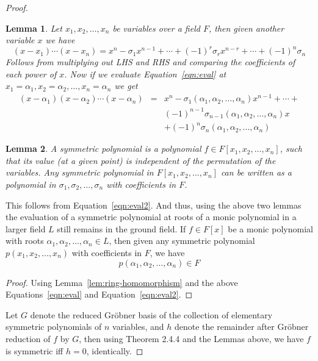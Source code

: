 \documentclass{article}[12pt]
\newtheorem{lem}{Lemma}
\begin{document}
\begin{proof}
\begin{lem}
Let $x_1,x_2,\ldots,x_n$ be variables over a field
$F$, then given another variable $x$ we have
\begin{equation}
(x-x_1)\cdots(x-x_n) = x^n -\sigma_1x^{n-1}+\cdots+(-1)^r\sigma_r x^{n-r}
+\cdots+(-1)^n\sigma_n \label{eqn:eval}
\end{equation}
Follows from multiplying out LHS and RHS and comparing the coefficients of each
power of $x$.
Now if we evaluate Equation~\ref{eqn:eval} at 
$x_1=\alpha_1,x_2=\alpha_2,\ldots,x_n=\alpha_n$ we get
\begin{eqnarray}
(x-\alpha_1)(x-\alpha_2)\cdots(x-\alpha_n) & = & x^n -\sigma_1(\alpha_1,\alpha_2,\ldots,\alpha_n)x^{n-1} +\cdots+ \nonumber \\
 & & (-1)^{n-1}\sigma_{n-1}(\alpha_1,\alpha_2,\ldots,\alpha_n)x \nonumber \\
 & & + (-1)^n\sigma_n(\alpha_1,\alpha_2,\ldots,\alpha_n) \label{eqn:eval2}
\end{eqnarray}
\end{lem}

\begin{lem}
A symmetric polynomial is a polynomial $f\in F[x_1,x_2,\ldots,x_n]$, such that
its value (at a given point) is independent of the permutation of the variables.
Any symmetric polynomial in $F[x_1,x_2,\ldots,x_n]$ can be written as 
a polynomial in $\sigma_1,\sigma_2,\ldots,\sigma_n$ with coefficients in $F$.
\end{lem}
This follows from Equation~\ref{eqn:eval2}. And thus, using the
above two lemmas the evaluation of a symmetric polynomial at roots of
a monic polynomial in a larger
field $L$ still remains in the ground field. If $f\in F[x]$ be a monic
polynomial with roots $\alpha_1,\alpha_2,\ldots,\alpha_n\in L$, then
given any symmetric polynomial $p(x_1,x_2,\ldots,x_n)$ with coefficients
in $F$, we have
\[
p(\alpha_1,\alpha_2,\ldots,\alpha_n) \in F
\]
\label{lem:ring-homomorphism2}
\begin{proof}
Using Lemma~\ref{lem:ring-homomorphism} and the above Equations~\ref{eqn:eval}
and Equation~\ref{eqn:eval2}.
\end{proof}

Let $G$ denote the reduced Gr\"obner basis of the collection of
elementary symmetric polynomials of $n$ variables, and $h$ denote
the remainder after Gr\"obner reduction of $f$ by $G$, then
using Theorem 2.4.4 and the Lemmas above, we have $f$ is symmetric iff
$h=0$, identically.
\end{proof}
\end{document}
